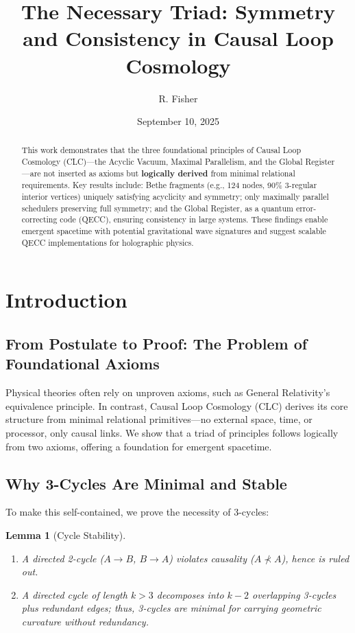 \documentclass[11pt, a4paper]{article}
\title{\textbf{The Necessary Triad: Symmetry and Consistency in Causal Loop Cosmology}}
\author{R. Fisher}
\date{September 10, 2025}
\newtheorem{lemma}{Lemma}[section]
\begin{document}
\maketitle

\begin{abstract}
\noindent This work demonstrates that the three foundational principles of Causal Loop Cosmology (CLC)—the Acyclic Vacuum, Maximal Parallelism, and the Global Register—are not inserted as axioms but \textbf{logically derived} from minimal relational requirements. Key results include: Bethe fragments (e.g., 124 nodes, 90\% 3-regular interior vertices) uniquely satisfying acyclicity and symmetry; only maximally parallel schedulers preserving full symmetry; and the Global Register, as a quantum error-correcting code (QECC), ensuring consistency in large systems. These findings enable emergent spacetime with potential gravitational wave signatures and suggest scalable QECC implementations for holographic physics.
\end{abstract}

\tableofcontents

\section{Introduction}

\subsection{From Postulate to Proof: The Problem of Foundational Axioms}
Physical theories often rely on unproven axioms, such as General Relativity’s equivalence principle. In contrast, Causal Loop Cosmology (CLC) derives its core structure from minimal relational primitives—no external space, time, or processor, only causal links. We show that a triad of principles follows logically from two axioms, offering a foundation for emergent spacetime.

\subsection{Why 3-Cycles Are Minimal and Stable}
To make this self-contained, we prove the necessity of 3-cycles:

\begin{lemma}[Cycle Stability]
\label{lem:cycle_stability}
\begin{enumerate}
    \item A directed 2-cycle ($A \to B$, $B \to A$) violates causality ($A \not\prec A$), hence is ruled out.
    \item A directed cycle of length $k > 3$ decomposes into $k-2$ overlapping 3-cycles plus redundant edges; thus, 3-cycles are minimal for carrying geometric curvature without redundancy.
\end{enumerate}
\end{lemma}
\end{document}
